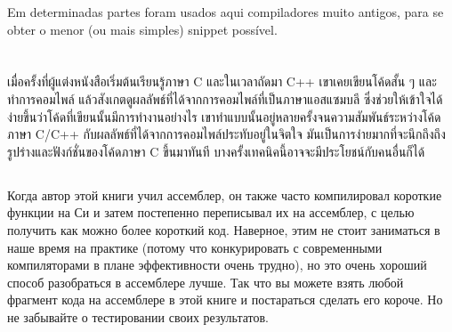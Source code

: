 
Em determinadas partes foram usados aqui compiladores muito antigos, para se obter o menor (ou mais simples) snippet possível.
\fi
\fi %

\ifdefined\THAI
\chapter{\THph{}}


เมื่อครั้งที่ผู้แต่งหนังสือเริ่มต้นเรียนรู้ภาษา C และในเวลาถัดมา C++ เขาเคยเขียนโค้ดสั้น ๆ และทำการคอมไพล์ แล้วสังเกตดูผลลัพธ์ที่ได้จากการคอมไพล์ที่เป็นภาษาแอสแซมบลี ซึ่งช่วยให้เข้าใจได้ง่ายขึ้นว่าโค้ดที่เขียนนั้นมีการทำงานอย่างไร เขาทำแบบนั้นอยู่หลายครั้งจนความสัมพันธ์ระหว่างโค้ดภาษา C/C++ กับผลลัพธ์ที่ได้จากการคอมไพล์ประทับอยู่ในจิตใจ มันเป็นการง่ายมากที่จะนึกถึงถึงรูปร่างและฟังก์ชั่นของโค้ดภาษา C ขึ้นมาทันที บางครั้งเทคนิคนี้อาจจะมีประโยชน์กับคนอื่นก็ได้	
\fi %

\ifdefined\IncludeExercises
\section*{\Exercises}

\ifdefined\RUSSIAN
Когда автор этой книги учил ассемблер, он также часто компилировал короткие функции на Си и затем постепенно 
переписывал их на ассемблер, с целью получить как можно более короткий код.
Наверное, этим не стоит заниматься в наше время на практике (потому что конкурировать с современными
компиляторами в плане эффективности очень трудно), но это очень хороший способ разобраться в ассемблере
лучше.
Так что вы можете взять любой фрагмент кода на ассемблере в этой книге и постараться сделать его короче.
Но не забывайте о тестировании своих результатов.
\fi %

